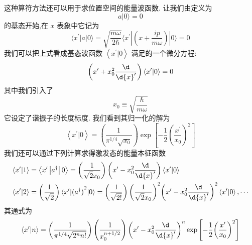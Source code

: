 这种算符方法还可以用于求位置空间的能量波函数. 让我们由定义为
\begin{equation}
a | 0\rangle = 0
\end{equation}
的基态开始,在 $x$ 表象中它记为
\begin{equation}
\langle {{x}^{\prime }\left| a\right| 0}\rangle = \sqrt{\frac{m\omega }{2\hbar }}\langle {{x}^{\prime }| \left( {x + \frac{ip}{m\omega }}\right) | 0}\rangle = 0
\end{equation}
我们可以把上式看成基态波函数 $\left\langle {{x}^\prime|0}\right\rangle$ 满足的一个微分方程:
\begin{equation}
\left( {{x}^{\prime } + {x}_{0}^{2}\frac{\d}{\d{x}^{\prime }}}\right) \left\langle {{x}^{\prime } | 0}\right\rangle = 0
\end{equation}
其中我们引入了
\begin{equation}
{x}_{0} \equiv \sqrt{\frac{\hbar }{m\omega }}
\end{equation}
它设定了谐振子的长度标度. 我们看到其归一化的解为
\begin{equation}
\left\langle {{x}^{\prime } | 0}\right\rangle = \left( \frac{1}{{\pi }^{1/4}\sqrt{{x}_{0}}}\right) \exp \left\lbrack {-\frac{1}{2}{\left( \frac{{x}^{\prime }}{{x}_{0}}\right) }^{2}}\right\rbrack
\end{equation}
我们还可以通过下列计算求得激发态的能量本征函数
\begin{equation}
\begin{aligned}
	\left\langle {{x}^{\prime } | 1}\right\rangle &= \left\langle {{x}^{\prime }\left| {a}^{ \dagger }\right| 0}\right\rangle = \left( \frac{1}{\sqrt{2}{x}_{0}}\right) \left( {{x}^{\prime } - {x}_{0}^{2}\frac{\d}{\d{x}^{\prime }}}\right) \left\langle {{x}^{\prime } | 0}\right\rangle\\
	\left\langle {{x}^{\prime } | 2}\right\rangle &= \left( \frac{1}{\sqrt{2}}\right) \langle {{x}^{\prime }| {( {a}^{ \dagger }) }^{2}| 0}\rangle = \left( \frac{1}{\sqrt{2!}}\right) {\left( \frac{1}{\sqrt{2}{x}_{0}}\right) }^{2}{\left( {x}^{\prime } - {x}_{0}^{2}\frac{\d}{\d{x}^{\prime }}\right) }^{2}\left\langle {{x}^{\prime } | 0}\right\rangle ,\cdots
\end{aligned}
\end{equation}
其通式为
\begin{equation}
\left\langle {{x}^{\prime } | n}\right\rangle = \left( \frac{1}{{\pi }^{1/4}\sqrt{{2}^{n}n!}}\right) \left( \frac{1}{{x}_{0}^{n + 1/2}}\right) {\left( {x}^{\prime } - {x}_{0}^{2}\frac{\d}{\d{x}^{\prime }}\right) }^{n}\exp \left\lbrack {-\frac{1}{2}{\left( \frac{{x}^{\prime }}{{x}_{0}}\right) }^{2}}\right\rbrack
\end{equation}
